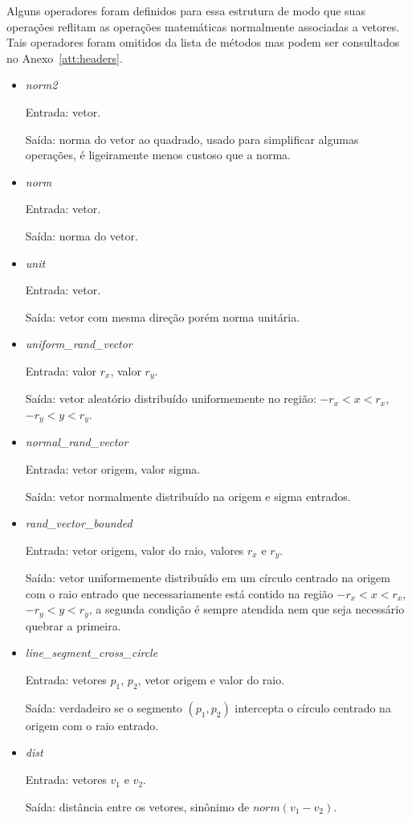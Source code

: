 Alguns operadores foram definidos para essa estrutura de modo que suas operações
reflitam as operações matemáticas normalmente associadas a vetores.  Tais
operadores foram omitidos da lista de métodos mas podem ser consultados no
Anexo~\ref{att:headers}.

\begin{itemize}
  \item \textit{norm2}
    \par Entrada: vetor.
    \par Saída: norma do vetor ao quadrado, usado para simplificar algumas
    operações, é ligeiramente menos custoso que a norma.
  \item \textit{norm}
    \par Entrada: vetor.
    \par Saída: norma do vetor.
  \item \textit{unit}
    \par Entrada: vetor.
    \par Saída: vetor com mesma direção porém norma unitária.
  \item \textit{uniform_rand_vector}
    \par Entrada: valor $r_x$, valor $r_y$.
    \par Saída: vetor aleatório distribuído uniformemente no região:
    $-r_x < x < r_x$, $-r_y < y < r_y$.
  \item \textit{normal_rand_vector}
    \par Entrada: vetor origem, valor sigma.
    \par Saída: vetor normalmente distribuído na origem e sigma entrados.
  \item \textit{rand_vector_bounded}
    \par Entrada: vetor origem, valor do raio, valores $r_x$ e $r_y$.
    \par Saída: vetor uniformemente distribuído em um círculo centrado na origem
    com o raio entrado que necessariamente está contido na região
    $-r_x < x < r_x$, $-r_y < y < r_y$, a segunda condição é sempre atendida nem
    que seja necessário quebrar a primeira.
  \item \textit{line_segment_cross_circle}
    \par Entrada: vetores $p_1$, $p_2$, vetor origem e valor do raio.
    \par Saída: verdadeiro se o segmento $(p_1, p_2)$ intercepta o círculo
    centrado na origem com o raio entrado.
  \item \textit{dist}
    \par Entrada: vetores $v_1$ e $v_2$.
    \par Saída: distância entre os vetores, sinônimo de $norm(v_1 - v_2)$.
\end{itemize}


